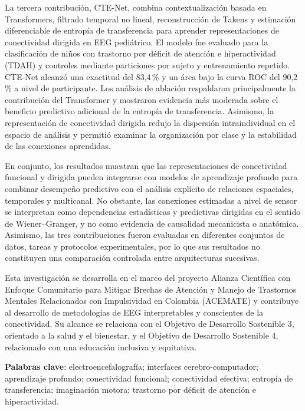La tercera contribución, CTE-Net, combina contextualización basada en Transformers, filtrado temporal no lineal, reconstrucción de Takens y estimación diferenciable de entropía de transferencia para aprender representaciones de conectividad dirigida en EEG pediátrico. El modelo fue evaluado para la clasificación de niños con trastorno por déficit de atención e hiperactividad (TDAH) y controles mediante particiones por sujeto y entrenamiento repetido. CTE-Net alcanzó una exactitud del 83,4\,\% y un área bajo la curva ROC del 90,2\,\% a nivel de participante. Los análisis de ablación respaldaron principalmente la contribución del Transformer y mostraron evidencia más moderada sobre el beneficio predictivo adicional de la entropía de transferencia. Asimismo, la representación de conectividad dirigida redujo la dispersión intraindividual en el espacio de análisis y permitió examinar la organización por clase y la estabilidad de las conexiones aprendidas.

En conjunto, los resultados muestran que las representaciones de conectividad funcional y dirigida pueden integrarse con modelos de aprendizaje profundo para combinar desempeño predictivo con el análisis explícito de relaciones espaciales, temporales y multicanal. No obstante, las conexiones estimadas a nivel de sensor se interpretan como dependencias estadísticas y predictivas dirigidas en el sentido de Wiener--Granger, y no como evidencia de causalidad mecanicista o anatómica. Asimismo, las tres contribuciones fueron evaluadas en diferentes conjuntos de datos, tareas y protocolos experimentales, por lo que sus resultados no constituyen una comparación controlada entre arquitecturas sucesivas.

Esta investigación se desarrolla en el marco del proyecto Alianza Científica con Enfoque Comunitario para Mitigar Brechas de Atención y Manejo de Trastornos Mentales Relacionados con Impulsividad en Colombia (ACEMATE) y contribuye al desarrollo de metodologías de EEG interpretables y conscientes de la conectividad. Su alcance se relaciona con el Objetivo de Desarrollo Sostenible 3, orientado a la salud y el bienestar, y el Objetivo de Desarrollo Sostenible 4, relacionado con una educación inclusiva y equitativa.

\vspace{2cm}
\textbf{Palabras clave}: electroencefalografía; interfaces cerebro-computador; aprendizaje profundo; conectividad funcional; conectividad efectiva; entropía de transferencia; imaginación motora; trastorno por déficit de atención e hiperactividad.